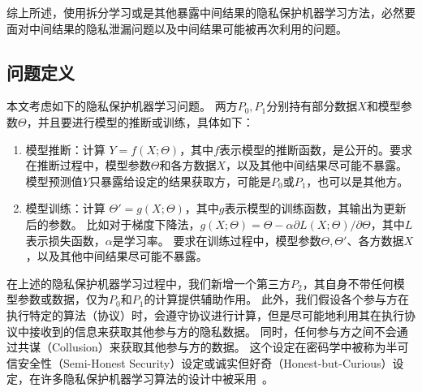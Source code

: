 综上所述，使用拆分学习或是其他暴露中间结果的隐私保护机器学习方法，必然要面对中间结果的隐私泄漏问题以及中间结果可能被再次利用的问题。


\subsection{问题定义}
本文考虑如下的隐私保护机器学习问题。
两方$P_0, P_1$分别持有部分数据$X$和模型参数$\Theta$，并且要进行模型的推断或训练，具体如下：
\begin{enumerate}[label=(\arabic*)]
    \item 模型推断：计算 $Y = f(X; \Theta)$，其中$f$表示模型的推断函数，是公开的。要求在推断过程中，模型参数$\Theta$和各方数据$X$，以及其他中间结果尽可能不暴露。
    模型预测值$Y$只暴露给设定的结果获取方，可能是$P_0$或$P_1$，也可以是其他方。
    \item 模型训练：计算 $\Theta' = g(X; \Theta)$，其中$g$表示模型的训练函数，其输出为更新后的参数。
    比如对于梯度下降法，$g(X;\Theta) = \Theta - \alpha \partial L(X;\Theta) / \partial \Theta$，其中$L$表示损失函数，$\alpha$是学习率。
    要求在训练过程中，模型参数$\Theta, \Theta'$、各方数据$X$，以及其他中间结果尽可能不暴露。
\end{enumerate}

在上述的隐私保护机器学习过程中，我们新增一个第三方$P_2$，其自身不带任何模型参数或数据，仅为$P_0$和$P_1$的计算提供辅助作用。
此外，我们假设各个参与方在执行特定的算法（协议）时，会遵守协议进行计算，但是尽可能地利用其在执行协议中接收到的信息来获取其他参与方的隐私数据。
同时，任何参与方之间不会通过共谋（Collusion）来获取其他参与方的数据。
%
这个设定在密码学中被称为半可信安全性（Semi-Honest Security）设定或诚实但好奇（Honest-but-Curious）设定，在许多隐私保护机器学习算法的设计中被采用~\cite{wagh2019securenn,mohassel2018aby3,riazi_2018_chameleon}。